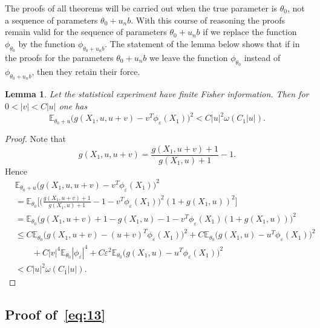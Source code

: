 \documentclass[11pt,a4paper]{article}
\newtheorem{lemma}[theorem]{Lemma}
\begin{document}
The proofs of all theorems will be carried out when the true parameter is $\theta_0$, not a sequence of parameters $\theta_0+u_nb$. With this course of reasoning the proofs remain valid for the sequence of parameters $\theta_0+u_nb$ if we replace the function $\phi_{\theta_0}$ by the function $\phi_{\theta_0+u_nb}$. The statement of the lemma below shows that if in the proofs for the parameters $\theta_0+u_nb$ we leave the function $\phi_{\theta_0}$ instead of $\phi_{\theta_0+u_nb}$, then they retain their force.

\begin{lemma}\label{lem:4.1}
Let the statistical experiment have finite Fisher information. Then for $0<|v|<C|u|$ one has
\begin{equation}
\mathbb{E}_{\theta_0+u}\bigl(g(X_1,u,u+v)-v^T\phi_\varepsilon(X_1)\bigr)^2<C|u|^2\omega(C_1|u|).
\end{equation}
\end{lemma}

\begin{proof}
Note that
\[
g(X_1,u,u+v)=\frac{g(X_1,u+v)+1}{g(X_1,u)+1}-1.
\]
Hence
\begin{align*}
&\mathbb{E}_{\theta_0+u}\bigl(g(X_1,u,u+v)-v^T\phi_\varepsilon(X_1)\bigr)^2\\
&=\mathbb{E}_{\theta_0}\Biggl[\Biggl(\frac{g(X_1,u+v)+1}{g(X_1,u)+1}-1-v^T\phi_\varepsilon(X_1)\Biggr)^2(1+g(X_1,u))^2\Biggr]\\
&=\mathbb{E}_{\theta_0}\bigl(g(X_1,u+v)+1-g(X_1,u)-1-v^T\phi_\varepsilon(X_1)(1+g(X_1,u))\bigr)^2\\
&\le C\mathbb{E}_{\theta_0}\bigl(g(X_1,u+v)-(u+v)^T\phi_\varepsilon(X_1)\bigr)^2+C\mathbb{E}_{\theta_0}\bigl(g(X_1,u)-u^T\phi_\varepsilon(X_1)\bigr)^2\\
&\qquad+C|v|^4\mathbb{E}_{\theta_0}|\phi_\varepsilon|^4+C\varepsilon^2\mathbb{E}_{\theta_0}\bigl(g(X_1,u)-u^T\phi_\varepsilon(X_1)\bigr)^2\\
&<C|u|^2\omega(C_1|u|).
\end{align*}
\end{proof}

\subsection{Proof of~\eqref{eq:13}}
\label{sub:13}
\end{document}

